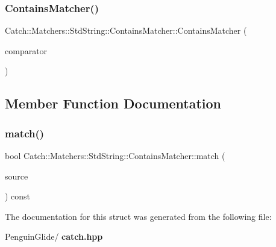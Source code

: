 \subsubsection{ContainsMatcher()}
{\footnotesize\ttfamily Catch\+::\+Matchers\+::\+Std\+String\+::\+Contains\+Matcher\+::\+Contains\+Matcher (\begin{DoxyParamCaption}\item[{\textbf{ Cased\+String} const \&}]{comparator }\end{DoxyParamCaption})}



\subsection{Member Function Documentation}
\mbox{\label{struct_catch_1_1_matchers_1_1_std_string_1_1_contains_matcher_a630628b234b037be83fe587081a80b53}} 
\subsubsection{match()}
{\footnotesize\ttfamily bool Catch\+::\+Matchers\+::\+Std\+String\+::\+Contains\+Matcher\+::match (\begin{DoxyParamCaption}\item[{std\+::string const \&}]{source }\end{DoxyParamCaption}) const\hspace{0.3cm}{\ttfamily [override]}}



The documentation for this struct was generated from the following file\+:\begin{DoxyCompactItemize}
\item 
Penguin\+Glide/\textbf{ catch.\+hpp}\end{DoxyCompactItemize}
